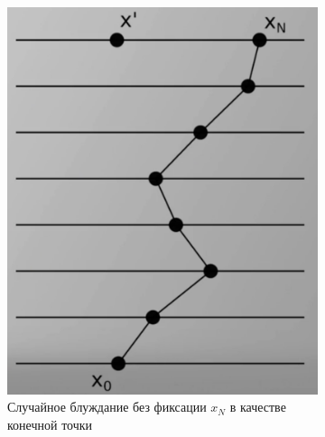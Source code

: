 \begin{lecture}
    \begin{figure}[ht]
        \begin{subfigure}{0.5\columnwidth}
            \centering\includegraphics[width=\linewidth]{fig/random-walk}
            \caption{Случайное блуждание без фиксации $x_N$ в качестве конечной точки}
            \label{fig:random-walk}
        \end{subfigure}
        \begin{subfigure}{0.5\columnwidth}

\end{subfigure}
\end{figure}
\end{lecture}
